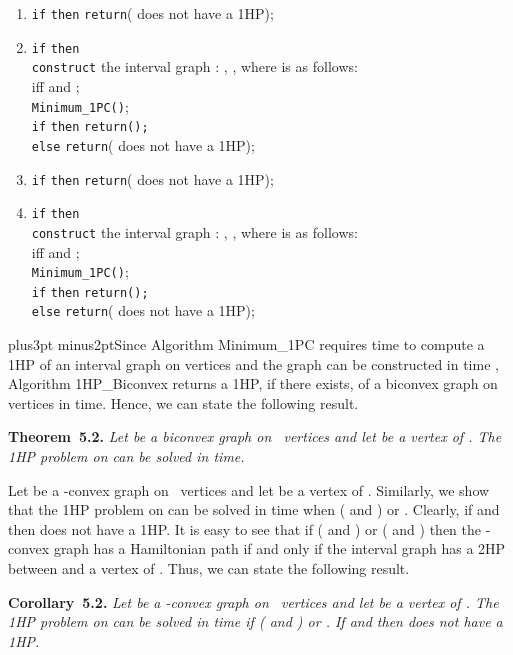 \documentclass[10pt]{article}
\def\yskip{\penalty-50\vskip3pt plus3pt minus2pt}
\def\y{\yskip}
\begin{document}
{\begin{enumerate}
  \item {\tt if}  {\tt then} {\tt return}( does not have a 1HP);
  \item {\tt if}  {\tt then} \\
         \phantom{if} {\tt construct} the interval graph : , , where  is as follows: \\
         \phantom{if} \phantom{if} \phantom{if}  iff  and ;\\
         \phantom{if} {\tt Minimum\_1PC()};\\
         \phantom{if} {\tt if}  {\tt then} {\tt return();}\\
         \phantom{if} {\tt else} {\tt return}( does not have a 1HP);
  \item {\tt if}  {\tt then} {\tt return}( does not have a 1HP);
  \item {\tt if}  {\tt then} \\
         \phantom{if} {\tt construct} the interval graph : , , where  is as follows: \\
         \phantom{if} \phantom{if}  iff  and ;\\
         \phantom{if} {\tt Minimum\_1PC()};\\
         \phantom{if} {\tt if}  {\tt then} {\tt return();}\\
         \phantom{if} {\tt else} {\tt return}( does not have a 1HP);
  \end{enumerate}


\y Since Algorithm Minimum\_1PC requires  time to compute
a 1HP of an interval graph on  vertices and the graph  can
be constructed in  time \cite{Muller}, Algorithm
1HP\_Biconvex returns a 1HP, if there exists, of a biconvex graph
on  vertices in  time. Hence, we can state the
following result.

\bigskip
\par\noindent
{\bf Theorem~5.2.} {\it Let  be a biconvex graph on
~vertices and let  be a vertex of . The 1HP problem on
 can be solved in  time.}

\bigskip Let  be a -convex graph on
~vertices and let  be a vertex of . Similarly, we show
that the 1HP problem on  can be solved in  time when
( and ) or . Clearly, if 
and  then  does not have a 1HP. It is easy to see that
if ( and ) or ( and ) then
the -convex graph  has a Hamiltonian path if and only
if the interval graph  has a 2HP between  and a vertex of
. Thus, we can state the following result.

\bigskip
\par\noindent
{\bf Corollary~5.2.} {\it Let  be a -convex graph on
~vertices and let  be a vertex of . The 1HP problem on
 can be solved in  time if ( and ) or
. If  and  then  does not have a
1HP.}



}
\end{document}

